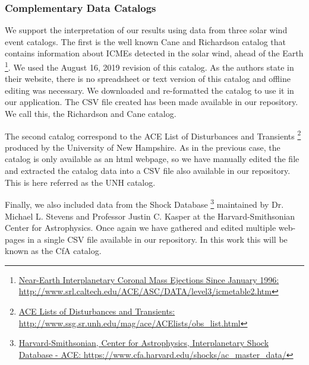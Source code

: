\subsubsection{Complementary Data Catalogs}
We support the interpretation of our results using data from three solar wind event catalogs. The first is the well known Cane and Richardson catalog that contains information about ICMEs detected in the solar wind, ahead of the Earth \citep{Cane2003} \citep{Richardson2010} \footnote{\href{http://www.srl.caltech.edu/ACE/ASC/DATA/level3/icmetable2.htm}{Near-Earth Interplanetary Coronal Mass Ejections Since January 1996: http://www.srl.caltech.edu/ACE/ASC/DATA/level3/icmetable2.htm}}. We used the August 16, 2019 revision of this catalog. As the authors state in their website, there is no spreadsheet or text version of this catalog and offline editing was necessary. We downloaded and re-formatted the catalog to use it in our application. The CSV file created has been made available in our repository. We call this, the Richardson and Cane catalog. 

The second catalog correspond to the ACE List of Disturbances and Transients \footnote{\href{http://www.ssg.sr.unh.edu/mag/ace/ACElists/obs\_list.html}{ACE Lists of Disturbances and Transients: http://www.ssg.sr.unh.edu/mag/ace/ACElists/obs\_list.html}} produced by the University of New Hampshire. As in the previous case, the catalog is only available as an html webpage, so we have manually edited the file and extracted the catalog data into a CSV file also available in our repository. This is here referred as the UNH catalog.


Finally, we also included data from the Shock Database \footnote{\href{https://www.cfa.harvard.edu/shocks/ac_master_data/}{Harvard-Smithsonian, Center for Astrophysics, Interplanetary Shock Database - ACE: https://www.cfa.harvard.edu/shocks/ac\_master\_data/}} maintained by Dr. Michael L. Stevens and Professor Justin C. Kasper at the Harvard-Smithsonian Center for Astrophysics. Once again we have gathered and edited multiple web-pages in a single CSV file available in our repository. In this work this will be known as the CfA catalog.